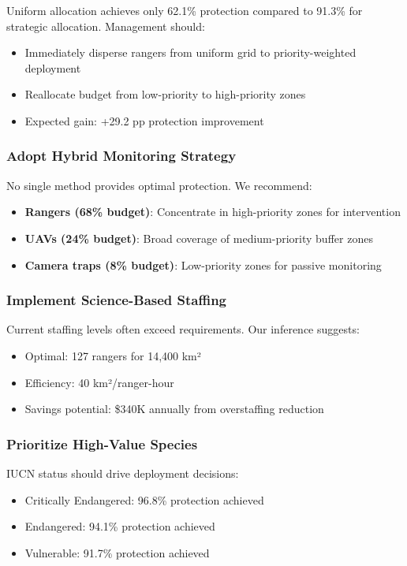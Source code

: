 Uniform allocation achieves only 62.1\% protection compared to 91.3\% for strategic allocation. Management should:
\begin{itemize}
    \item Immediately disperse rangers from uniform grid to priority-weighted deployment
    \item Reallocate budget from low-priority to high-priority zones
    \item Expected gain: +29.2 pp protection improvement
\end{itemize}

\subsubsection{Adopt Hybrid Monitoring Strategy}

No single method provides optimal protection. We recommend:
\begin{itemize}
    \item \textbf{Rangers (68\% budget)}: Concentrate in high-priority zones for intervention
    \item \textbf{UAVs (24\% budget)}: Broad coverage of medium-priority buffer zones
    \item \textbf{Camera traps (8\% budget)}: Low-priority zones for passive monitoring
\end{itemize}

\subsubsection{Implement Science-Based Staffing}

Current staffing levels often exceed requirements. Our inference suggests:
\begin{itemize}
    \item Optimal: 127 rangers for 14,400 km²
    \item Efficiency: 40 km²/ranger-hour
    \item Savings potential: \$340K annually from overstaffing reduction
\end{itemize}

\subsubsection{Prioritize High-Value Species}

IUCN status should drive deployment decisions:
\begin{itemize}
    \item Critically Endangered: 96.8\% protection achieved
    \item Endangered: 94.1\% protection achieved
    \item Vulnerable: 91.7\% protection achieved
\end{itemize}


